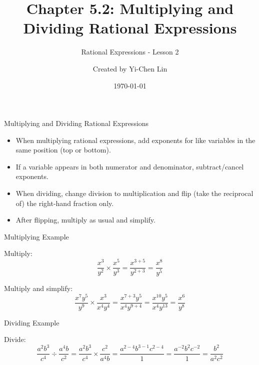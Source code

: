 \documentclass[aspectratio=169]{beamer}
\title{Chapter 5.2: Multiplying and Dividing Rational Expressions}
\subtitle{Rational Expressions - Lesson 2}
\author{Created by Yi-Chen Lin}
\date{\today}
\begin{document}
\begin{frame}
\titlepage
\end{frame}

\begin{frame}{Multiplying and Dividing Rational Expressions}
\begin{tcolorbox}[colback=lightgray,colframe=primary,title=Key Concepts]
\footnotesize
\begin{itemize}
  \item When multiplying rational expressions, add exponents for like variables in the same position (top or bottom).
  \item If a variable appears in both numerator and denominator, subtract/cancel exponents.
  \item When dividing, change division to multiplication and flip (take the reciprocal of) the right-hand fraction only.
  \item After flipping, multiply as usual and simplify.
\end{itemize}
\end{tcolorbox}
\end{frame}

\begin{frame}{Multiplying Example}
\begin{tcolorbox}[colback=lightgray,colframe=secondary,title=Example 1]
\footnotesize
Multiply:
\[
\frac{x^3}{y^2} \times \frac{x^5}{y^3} = \frac{x^{3+5}}{y^{2+3}} = \frac{x^8}{y^5}
\]
\end{tcolorbox}

\begin{tcolorbox}[colback=lightgray,colframe=secondary,title=Example 2]
\footnotesize
Multiply and simplify:
\[
\frac{x^7 y^5}{y^9} \times \frac{x^3}{x^4 y^4} = \frac{x^{7+3} y^5}{x^4 y^{9+4}} = \frac{x^{10} y^5}{x^4 y^{13}} = \frac{x^{6}}{y^{8}}
\]
\end{tcolorbox}
\end{frame}

\begin{frame}{Dividing Example}
\begin{tcolorbox}[colback=lightgray,colframe=secondary,title=Example 3]
\footnotesize
Divide:
\[
\frac{a^2 b^3}{c^4} \div \frac{a^4 b}{c^2} = \frac{a^2 b^3}{c^4} \times \frac{c^2}{a^4 b} = \frac{a^{2-4} b^{3-1} c^{2-4}}{1} = \frac{a^{-2} b^{2} c^{-2}}{1} = \frac{b^2}{a^2 c^2}
\]
\end{tcolorbox}
\end{frame}
\end{document}
